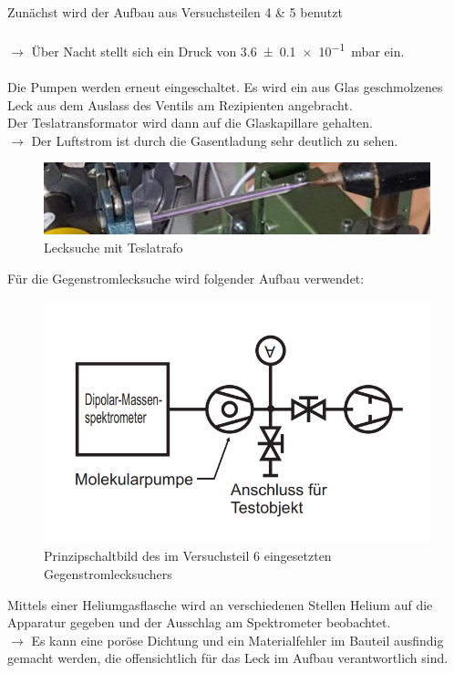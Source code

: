 \documentclass[12pt, a4paper]{scrartcl}
\begin{document}
		Zunächst wird der Aufbau aus Versuchsteilen 4 \& 5 benutzt\\\\	
		$\rightarrow$ Über Nacht stellt sich ein Druck von 
        \SI{3.6+-0.1 e-1}{mbar}
        ein.\\\\
		Die Pumpen werden erneut eingeschaltet. Es wird ein aus Glas geschmolzenes Leck aus dem Auslass des Ventils am Rezipienten angebracht.\\
		Der Teslatransformator wird dann auf die Glaskapillare gehalten.\\
		$\rightarrow$ Der Luftstrom ist durch die Gasentladung sehr deutlich zu sehen.
        \begin{figure}[H]
            \centering
            \includegraphics[width=.6\paperwidth]{foto2}
            \caption{Lecksuche mit Teslatrafo}
        \end{figure}	
		Für die Gegenstromlecksuche wird folgender Aufbau verwendet:
		
		\begin{figure}[H]
			\centering
			\includegraphics[width=.3\paperwidth]{aufbau262}
			\caption{Prinzipschaltbild des im Versuchsteil 6 eingesetzten Gegenstromlecksuchers}
			\label{fig:anord6}
		\end{figure}
		Mittels einer Heliumgasflasche wird an verschiedenen Stellen Helium auf die Apparatur gegeben und der Ausschlag am Spektrometer beobachtet.\\
		$\rightarrow$ Es kann eine poröse Dichtung und ein Materialfehler im Bauteil ausfindig gemacht werden, die offensichtlich für das Leck im Aufbau verantwortlich sind.
\end{document}
